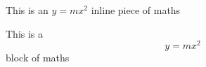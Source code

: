\documentclass[a4paper]{article}
\begin{document}
This is an $y = mx^2$ inline piece of maths


This is a$$y = mx^2$$block of maths
\end{document}
